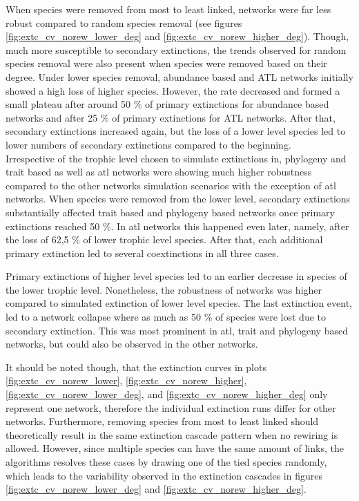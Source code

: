 \documentclass[12pt,a4paper]{article}
\begin{document}
When species were removed from most to least linked, networks were far less robust compared to random species removal (see figures \ref{fig:extc_cv_norew_lower_deg} and \ref{fig:extc_cv_norew_higher_deg}). Though, much more susceptible to secondary extinctions, the trends observed for random species removal were also present when species were removed based on their degree. Under lower species removal, abundance based and ATL networks initially showed a high loss of higher species. However, the rate decreased and formed a small plateau after around 50 \% of primary extinctions for abundance based networks and after 25 \% of primary extinctions for ATL networks. After that, secondary extinctions increased again, but the loss of a lower level species led to lower numbers of secondary extinctions compared to the beginning.\\ Irrespective of the trophic level chosen to simulate extinctions in, phylogeny and trait based as well as atl networks were showing much higher robustness compared to the other networks simulation scenarios with the exception of atl networks. When species were removed from the lower level, secondary extinctions substantially affected trait based and phylogeny based networks once primary extinctions reached 50 \%. In atl networks this happened even later, namely, after the loss of 62,5 \% of lower trophic level species. After that, each additional primary extinction led to several coextinctions in all three cases. \par 
Primary extinctions of higher level species led to an earlier decrease in species of the lower trophic level. Nonetheless, the robustness of networks was higher compared to simulated extinction of lower level species. The last extinction event, led to a network collapse where as much as 50 \% of species were lost due to secondary extinction. This was most prominent in atl, trait and phylogeny based networks, but could also be observed in the other networks. \par

It should be noted though, that the extinction curves in plots \ref{fig:extc_cv_norew_lower}, \ref{fig:extc_cv_norew_higher}, \ref{fig:extc_cv_norew_lower_deg}, and \ref{fig:extc_cv_norew_higher_deg} only represent one network, therefore the individual extinction runs differ for other networks. Furthermore, removing species from most to least linked should theoretically result in the same extinction cascade pattern when no rewiring is allowed. However, since multiple species can have the same amount of links, the algorithms resolves these cases by drawing one of the tied species randomly, which leads to the variability observed in the extinction cascades in figures \ref{fig:extc_cv_norew_lower_deg} and \ref{fig:extc_cv_norew_higher_deg}.
\end{document}
